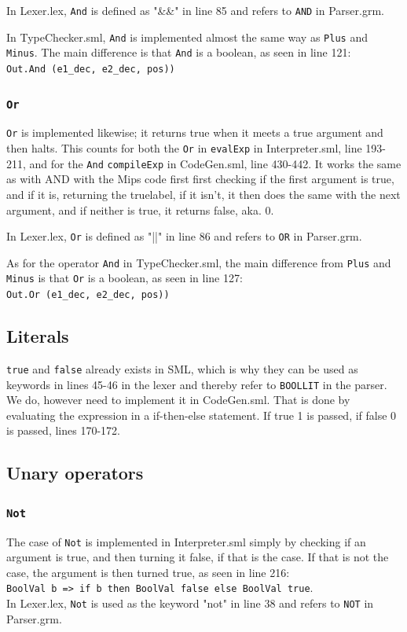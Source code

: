 \documentclass[11pt,a4paper]{article}
\theoremstyle{plain}
\theoremstyle{definition}
\theoremstyle{remark}
\numberwithin{equation}{section}
\begin{document}
	In Lexer.lex, \texttt{And} is defined as "\&\&" in line 85 and refers to \texttt{AND} in Parser.grm.
	
	In TypeChecker.sml, \texttt{And} is implemented almost the same way as \texttt{Plus} and \texttt{Minus}. The main difference is that \texttt{And} is a boolean, as seen in line 121:\\
	\texttt{Out.And (e1\_dec, e2\_dec, pos))}
	
	\subsubsection{\texttt{Or}}
	\texttt{Or} is implemented likewise; it returns true when it meets a true argument and then halts. This counts for both the \texttt{Or} in \texttt{evalExp} in Interpreter.sml, line 193-211, and for the \texttt{And} \texttt{compileExp} in CodeGen.sml, line 430-442. It works the same as with AND with the Mips code first first checking if the first argument is true, and if it is, returning the truelabel, if it isn't, it then does the same with the next argument, and if neither is true, it returns false, aka. 0.
	
	In Lexer.lex, \texttt{Or} is defined as "||" in line 86 and refers to \texttt{OR} in Parser.grm.
	
	As for the operator \texttt{And} in TypeChecker.sml, the main difference from \texttt{Plus} and \texttt{Minus} is that \texttt{Or} is a boolean, as seen in line 127:\\
	\texttt{Out.Or (e1\_dec, e2\_dec, pos))}
	
	\subsection{Literals}
	\texttt{true} and \texttt{false} already exists in SML, which is why they can be used as keywords in lines 45-46 in the lexer and thereby refer to \texttt{BOOLLIT} in the parser.\\ 
	We do, however need to implement it in CodeGen.sml. That is done by evaluating the expression in a if-then-else statement. If true 1 is passed, if false 0 is passed, lines 170-172.
	
	\subsection{Unary operators} 
	\subsubsection{\texttt{Not}}
	The case of \texttt{Not} is implemented in Interpreter.sml simply by checking if an argument is true, and then turning it false, if that is the case. If that is not the case, the argument is then turned true, as seen in line 216:\\
	\texttt{BoolVal b => if b then BoolVal false else BoolVal true}.\\
	In Lexer.lex, \texttt{Not} is used as the keyword "not" in line 38 and refers to \texttt{NOT} in Parser.grm.\\
	
\end{document}
